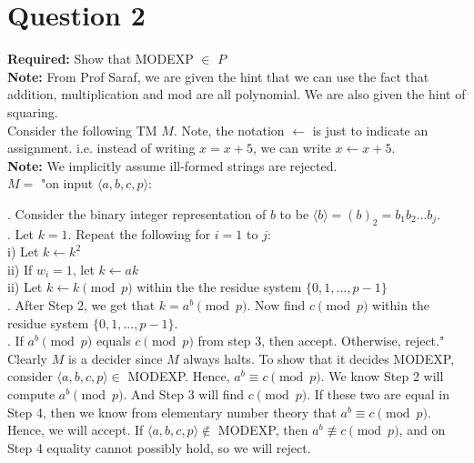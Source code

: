 \documentclass[12pt]{article}
\begin{document}
\newpage

\section*{Question 2}

\textbf{Required:} Show that MODEXP $\in$ $P$ \\

\textbf{Note:} From Prof Saraf, we are given the hint that we can use the fact that addition, multiplication and mod are all polynomial. We are also given the hint of squaring. \\

Consider the following TM $M$. Note, the notation $\leftarrow$ is just to indicate an assignment. i.e. instead of writing $x = x + 5$, we can write $x \leftarrow x + 5$. \\

\textbf{Note:} We implicitly assume ill-formed strings are rejected. \\

$M = $ "on input $\langle a,b,c,p \rangle$: \\

\setlength\parindent{15pt}

. Consider the binary integer representation of $b$ to be $\langle b \rangle  = (b)_2 = b_1b_2...b_j$. \\

. Let $k = 1$. Repeat the following for $i = 1$ to $j$: \\
\indent \indent \indent i) Let $k \leftarrow k^2$ \\
\indent \indent \indent ii) If $w_i = 1$, let $k \leftarrow ak$ \\
\indent \indent \indent ii) Let $k \leftarrow k \pmod{p}$ within the the residue system $\{0,1,...,p-1\}$ \\

. After Step 2, we get that $k = a^b \pmod{p}$. Now find $c \pmod{p}$ within the residue system $\{0,1,...,p-1\}$. \\ 

. If $a^b \pmod{p}$ equals $c \pmod{p}$ from step 3, then accept. Otherwise, reject." \\

\setlength\parindent{0pt}
Clearly $M$ is a decider since $M$ always halts. To show that it decides MODEXP, consider $\langle a,b,c,p \rangle \in $ MODEXP. Hence, $a^b \equiv c \pmod{p}$. We know Step 2 will compute $a^b \pmod{p}$. And Step 3 will find $c \pmod{p}$. If these two are equal in Step 4, then we know from elementary number theory that $a^b \equiv c \pmod{p}$. Hence, we will accept. If $\langle a,b,c,p \rangle \not \in $ MODEXP, then $a^b \not \equiv c \pmod{p}$, and on Step 4 equality cannot possibly hold, so we will reject. \\
\end{document}
